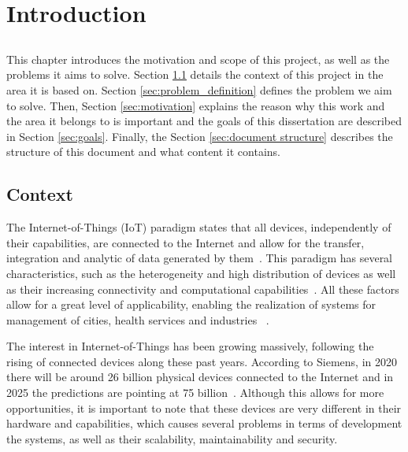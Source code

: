 \chapter{Introduction} \label{chap:intro} \minitoc

\section*{}

This chapter introduces the motivation and scope of this project, as well as the problems it aims to solve. Section \ref{sec:context} details the context of this project in the area it is based on. Section \ref{sec:problem_definition} defines the problem we aim to solve. Then, Section \ref{sec:motivation} explains the reason why this work and the area it belongs to is important and the goals of this dissertation are described in Section \ref{sec:goals}. Finally, the Section \ref{sec:document structure} describes the structure of this document and what content it contains.

\section{Context} \label{sec:context}

The Internet-of-Things (IoT) paradigm states that all devices, independently of their capabilities, are connected to the Internet and allow for the transfer, integration and analytic of data generated by them~\cite{IoT_principles_and_paradigms}. This paradigm has several characteristics, such as the heterogeneity and high distribution of devices as well as their increasing connectivity and computational capabilities~\cite{SoS}. All these factors allow for a great level of applicability, enabling the realization of systems for management of cities, health services and industries ~\cite{6851114}.

The interest in Internet-of-Things has been growing massively, following the rising of connected devices along these past years. According to Siemens, in 2020 there will be around 26 billion physical devices connected to the Internet and in 2025 the predictions are pointing at 75 billion~\cite{tanweer}. Although this allows for more opportunities, it is important to note that these devices are very different in their hardware and capabilities, which causes several problems in terms of development the systems, as well as their scalability, maintainability and security. 

